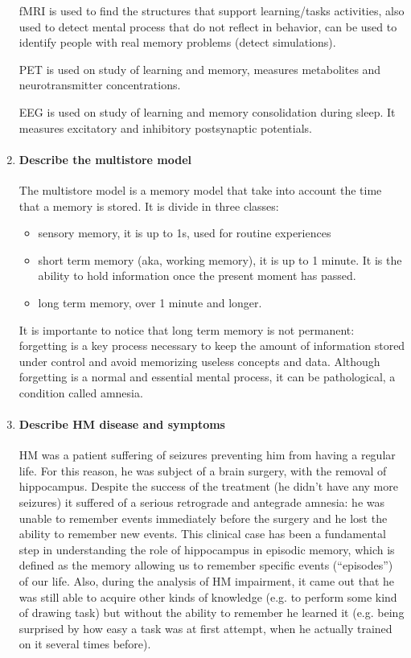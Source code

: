 \documentclass[12pt,article,oneside,a4paper]{memoir}
\begin{document}
\begin{enumerate}
fMRI is used to find the structures that support learning/tasks activities,
also used to detect mental process that do not reflect in behavior, can be
used to identify people with real memory problems (detect simulations).

PET is used on study of learning and memory, measures metabolites and
neurotransmitter concentrations.

EEG is used on study of learning and memory consolidation during sleep. It
measures excitatory and inhibitory postsynaptic potentials.

\item \paragraph{Describe the multistore model}

The multistore model is a memory model that take into account the time that a
memory is stored. It is divide in three classes:
\begin{itemize}
\item sensory memory, it is up to 1s, used for routine experiences
\item short term memory (aka, working memory), it is up to 1 minute. It is the
ability to hold information once the present moment has passed.
\item long term memory, over 1 minute and longer.
\end{itemize}

It is importante to notice that long term memory is not permanent: forgetting
is a key process necessary to keep the amount of information stored under
control and avoid memorizing useless concepts and data. Although forgetting is
a normal and essential mental process, it can be pathological, a condition
called amnesia.

\item \paragraph{Describe HM disease and symptoms}
HM was a patient suffering of seizures preventing him from having a regular
life. For this reason, he was subject of a brain surgery, with the removal of
hippocampus. Despite the success of the treatment (he didn’t have any more
seizures) it suffered of a serious retrograde and antegrade amnesia: he was
unable to remember events immediately before the surgery and he lost the
ability to remember new events. This clinical case has been a fundamental step
in understanding the role of hippocampus in episodic memory, which is defined
as the memory allowing us to remember specific events (“episodes”) of our life.
Also, during the analysis of HM impairment, it came out that he was still able
to acquire other kinds of knowledge (e.g. to perform some kind of drawing task)
but without the ability to remember he learned it (e.g. being surprised by how
easy a task was at first attempt, when he actually trained on it several times
before).


\end{enumerate}
\end{document}
